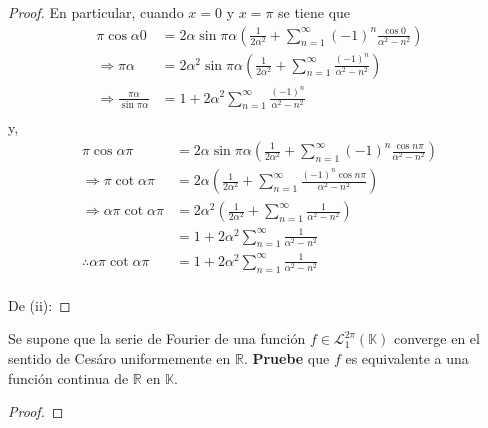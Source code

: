 \documentclass[12pt]{report}
\theoremstyle{largebreak}
\begin{document}
\begin{proof}
        En particular, cuando $x=0$ y $x=\pi$ se tiene que
        \begin{equation*}
            \begin{split}
                \pi\cos \alpha 0&=2\alpha\sin\pi\alpha\left(\frac{1}{2\alpha^2}+\sum_{n=1}^{\infty}(-1)^n\frac{\cos 0}{\alpha^2-n^2}\right)\\
                \Rightarrow \pi\alpha&=2\alpha^2\sin\pi\alpha\left(\frac{1}{2\alpha^2}+\sum_{n=1}^{\infty}\frac{(-1)^n}{\alpha^2-n^2}\right)\\
                \Rightarrow \frac{\pi\alpha}{\sin\pi\alpha}&=1+2\alpha^2\sum_{n=1}^{\infty}\frac{(-1)^n}{\alpha^2-n^2}\\
            \end{split}
        \end{equation*}
        y,
        \begin{equation*}
            \begin{split}
                \pi\cos \alpha\pi&=2\alpha\sin\pi\alpha\left(\frac{1}{2\alpha^2}+\sum_{n=1}^{\infty}(-1)^n\frac{\cos n\pi}{\alpha^2-n^2}\right)\\
                \Rightarrow \pi\cot\alpha\pi&=2\alpha\left(\frac{1}{2\alpha^2}+\sum_{n=1}^{\infty}\frac{(-1)^n\cos n\pi}{\alpha^2-n^2}\right)\\
                \Rightarrow \alpha\pi\cot\alpha\pi&=2\alpha^2\left(\frac{1}{2\alpha^2}+\sum_{n=1}^{\infty}\frac{1}{\alpha^2-n^2}\right)\\
                &=1+2\alpha^2\sum_{n=1}^{\infty}\frac{1}{\alpha^2-n^2}\\
                \therefore\alpha\pi\cot\alpha\pi&=1+2\alpha^2\sum_{n=1}^{\infty}\frac{1}{\alpha^2-n^2}\\
            \end{split}
        \end{equation*}

        De (ii): %
    \end{proof}

    \begin{excer}
        Se supone que la serie de Fourier de una función $f\in\mathcal{L}_1^{2\pi}(\mathbb{K})$ converge en el sentido de Cesáro uniformemente en $\mathbb{R}$. \textbf{Pruebe} que $f$ es equivalente a una función continua de $\mathbb{R}$ en $\mathbb{K}$.
    \end{excer}

    \begin{proof}
        
    \end{proof}
\end{document}
